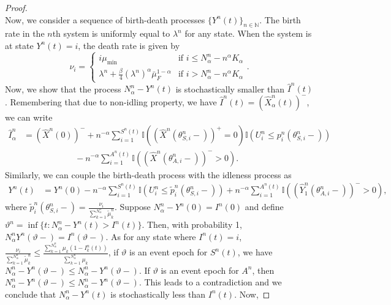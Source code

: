\documentclass[a4paper,11pt,twoside]{article}
\numberwithin{equation}{section}
\numberwithin{figure}{section}
\theoremstyle{plain}
\newcommand{\II}{\mathbb{I}}
\newcommand{\NN}{\mathbb{N}}
\newcommand{\1}{\mathbbm{1}}
\begin{document}
\begin{proof}
\[\]
Now, we consider a sequence of birth-death processes $\{Y^n(t)\}_{n\in \NN}$. The birth rate in the $n$th system is uniformly equal to $\lambda^n$ for any state. When the system is at state $Y^n(t)=i$, the death rate is given by
\begin{equation*}
\nu_i =\left\{\begin{array}{ll} i\mu_{\min}&\mbox{if }i\leq N^n_\alpha-n^{\alpha}K_\alpha\\
\lambda^n+\frac{\beta}{4}(\lambda^n)^{\alpha}\bar{\mu}_F^{1-\alpha} &\mbox{if }i>N^n_\alpha-n^{\alpha}K_\alpha
\end{array}\right..
\end{equation*}
Now, we show that the process $N^n_\alpha-Y^n(t)$ is stochastically smaller than $\hat{I}^n(t)$. Remembering that due to non-idling property, we have  $\hat{I}^n(t)=(\hat{X}_\alpha^n(t))^-$, we can write
\begin{align*}
    \hat{I}_\alpha^n&=  \left(\hat{X}^n(0)\right)^-+n^{-\alpha}\sum_{i=1}^{S^n(t)}\II\left(\left(\hat{X}^n(\theta_{S,i}^n-)\right)^+=0\right)\II\left(U_i^n\leq p_i^n\left(\theta_{S,i}^n-\right)\right)\\&\qquad\qquad\qquad-n^{-\alpha}\sum_{i=1}^{A^n(t)}\II\left( \left(\hat{X}^n(\theta_{A,i}^n-)\right)^->0\right).
\end{align*}
Similarly, we can couple the birth-death process with the idleness process as
\begin{align*}
Y^n(t)&= Y^n(0)-n^{-\alpha}\sum_{i=1}^{S^n(t)}\II\left(U_i^n\leq \tilde{p}_i^n\left(\theta_{S,i}^n-\right)\right)%
+n^{-\alpha}\sum_{i=1}^{A^n(t)}\II\left( \left(\hat{Y}_1^n(\theta_{A,i}^n-)\right)^->0\right),
\end{align*}
where $\tilde{p}_i^n\left(\theta_{S,i}^n-\right)=\frac{\nu_i}{\sum_{k=1}^{N^n_\alpha}\tilde{\mu}_k^n}$. 
Suppose $N^n_\alpha-Y^n(0)=I^n(0)$ and define $\vartheta^n=\inf\{t: N^n_\alpha-Y^n(t)>I^n(t)\}$. 
Then, with probability 1, $N^n_\alpha Y^n(\vartheta-)=I^n(\vartheta-)$. 
As for any state where $I^n(t)=i$, $\frac{\nu_i}{\sum_{k=1}^{N^n_\alpha}\tilde{\mu}_k^n}\leq \frac{\sum_{k=1}^{N^n_\alpha}\mu_k(1-I_k^n(t))}{\sum_{k=1}^{N^n_\alpha}\mu_k}$, if $\vartheta$ is an event epoch for $S^n(t)$, we have $N^n_\alpha-Y^n(\vartheta-)\leq N^n_\alpha-Y^n(\vartheta-)$. If $\vartheta$ is an event epoch for $A^n$, then $N^n_\alpha-Y^n(\vartheta-)\leq N^n_\alpha-Y^n(\vartheta-)$. This leads to a contradiction and we conclude that $N^n_\alpha-Y^n(t)$ is stochastically less than $I^n(t)$. 
Now, 

\end{proof}
\end{document}
